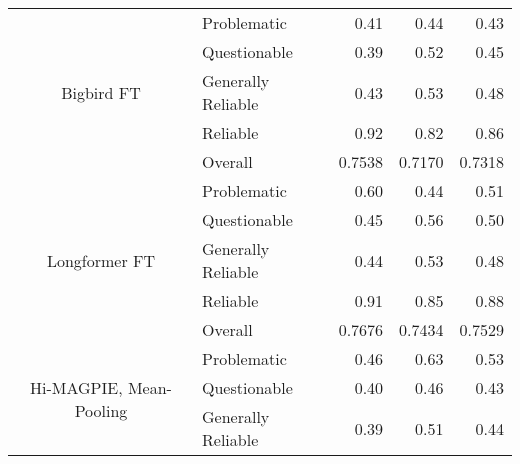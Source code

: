 \begin{table}[htbp]
\begin{tabular}{| c | l | r | r | r |}
        \multirow{5}{*}{Bigbird FT}                       & Problematic        & 0.41               & 0.44            & 0.43            \\
                                                          & Questionable       & 0.39               & 0.52            & 0.45            \\
                                                          & Generally Reliable & 0.43               & 0.53            & 0.48            \\
                                                          & Reliable           & 0.92               & 0.82            & 0.86            \\\cline{2-5}
                                                          & Overall            & 0.7538             & 0.7170          & 0.7318          \\
        \hline
        \multirow{5}{*}{Longformer FT}                    & Problematic        & 0.60               & 0.44            & 0.51            \\
                                                          & Questionable       & 0.45               & 0.56            & 0.50            \\
                                                          & Generally Reliable & 0.44               & 0.53            & 0.48            \\
                                                          & Reliable           & 0.91               & 0.85            & 0.88            \\\cline{2-5}
                                                          & Overall            & 0.7676             & 0.7434          & 0.7529          \\
        \hline
        \multirow{5}{*}{Hi-MAGPIE, Mean-Pooling}           & Problematic        & 0.46               & 0.63            & 0.53            \\
                                                          & Questionable       & 0.40               & 0.46            & 0.43            \\
                                                          & Generally Reliable & 0.39               & 0.51            & 0.44            \\

\end{tabular}
\end{table}
